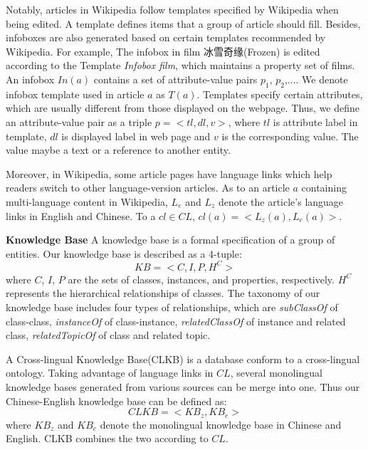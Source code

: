 \documentclass[runningheads,a4paper]{llncs}
\newcommand{\para}[1]{\vspace{0.1cm}\noindent\textbf{#1}}
\begin{document}
Notably, articles in Wikipedia follow templates specified by Wikipedia when being edited. A template defines items that a group of article should fill. Besides, infoboxes are also generated based on certain templates recommended by Wikipedia. For example, The infobox in film 冰雪奇缘(Frozen) is edited according to the Template \emph{Infobox film}, which maintains a property set of films. An infobox $In(a)$ contains a set of attribute-value pairs {$p_{1}$, $p_{2}$,...}. We denote infobox template used in article $a$ as $T(a)$. Templates specify certain attributes, which are usually different from those displayed on the webpage. Thus, we define an attribute-value pair as a triple $p=<tl,dl,v>$, where $tl$ is attribute label in template, $dl$ is displayed label in web page and $v$ is the corresponding value. The value maybe a text or a reference to another entity.

Moreover, in Wikipedia, some article pages have language links which help readers switch to other language-version articles. %
As to an article $a$ containing multi-language content in Wikipedia, $L_{e}$ and $L_{z}$ denote the article's language links in English and Chinese. To a $cl \in CL$, $cl(a) = <L_{z}(a), L_{e}(a)>$.

\para{Knowledge Base} A knowledge base is a formal specification of a group of entities. Our knowledge base is described as a 4-tuple:
\begin{equation}
    KB = <C,I,P,H^C>
\end{equation}
where $C$, $I$, $P$ are the sets of classes, instances, and properties, respectively. $H^C$ represents the hierarchical relationships of classes. The taxonomy of our knowledge base includes four types of relationships, which are \textit{subClassOf} of class-class, \textit{instanceOf} of class-instance, \textit{relatedClassOf} of instance and related class, \textit{relatedTopicOf} of class and related topic.

A Cross-lingual Knowledge Base(CLKB) is a database conform to a cross-lingual ontology. Taking advantage of language links in $CL$, several monolingual knowledge bases generated from various sources can be merge into one.  Thus our Chinese-English knowledge base can be defined as:
\begin{equation}
    CLKB = <KB_{z}, KB_{e}>
\end{equation}
where $KB_{z}$ and $KB_{e}$ denote the monolingual knowledge base in Chinese and English. CLKB combines the two according to $CL$.
\end{document}
